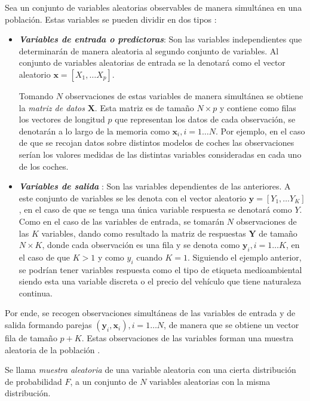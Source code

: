 
\noindent Sea un conjunto de variables aleatorias observables de manera simultánea en una población. Estas variables se pueden dividir en dos tipos \cite{Hastie 2001}:
\begin{itemize}
\item \textbf{\textit{Variables de entrada o predictoras}}: Son las variables independientes que determinarán de manera aleatoria al segundo conjunto de variables. Al conjunto de variables aleatorias de entrada se la denotará como el vector aleatorio $\textbf{x}=[X_1,\ldots X_p]$. \\
\begin{defi}
Tomando $N$ observaciones de estas variables  de manera simultánea se obtiene la \textit{matriz de datos} $\textbf{X}$. Esta matriz es de tamaño $N\times p$ y contiene como filas los vectores de longitud $p$ que representan los datos de cada observación, se denotarán a lo largo de la memoria como $\textbf{x}_i, i=1\ldots N$. Por ejemplo, en el caso de que se recojan datos sobre distintos modelos de coches las observaciones serían los valores medidas de las distintas variables consideradas en cada uno de los coches. 
\end{defi}
\item \textbf{\textit{Variables de salida }}: Son las variables dependientes de las anteriores. A este conjunto de variables se les denota con el vector aleatorio $\textbf{y}=[Y_1,\ldots Y_K]$, en el caso de que se tenga una única variable respuesta se denotará como $Y$. \\
Como en el caso de las variables de entrada, se tomarán $N$ observaciones de las $K$ variables, dando como resultado la matriz de respuestas $\textbf{Y}$ de tamaño $N \times K$, donde cada observación es una fila y se denota como $\mathbf{y}_i, i=1\ldots K$, en el caso de que $K>1$ y como $y_i$ cuando $K=1$. Siguiendo el ejemplo anterior, se podrían tener variables respuesta como el tipo de etiqueta medioambiental siendo esta una variable discreta o el precio del vehículo que tiene naturaleza continua. 
\end{itemize}
\noindent Por ende, se recogen observaciones simultáneas de las variables de entrada y de salida formando parejas $(\mathbf{y}_i,\textbf{x}_i), i=1\ldots N$, de manera que se obtiene un vector fila de tamaño $p+K$. Estas observaciones de las variables forman una muestra aleatoria de la población .
\begin{defi}
Se llama \emph{muestra aleatoria} de una variable aleatoria con una cierta distribución de probabilidad $F$, a un conjunto de $N$ variables aleatorias con la misma distribución. 
\end{defi} 

